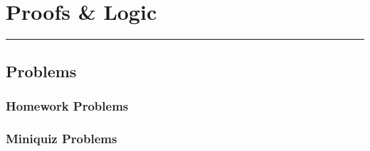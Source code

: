 \usenotesproblems
\renewcommand{\linput}[1]{}

\chapter{Proofs \& Logic}\label{C01}


\instatements{\linput{Section0100}}

\instatements{\linput{Section0101}}
\startclassproblems

\instatements{\linput{Section0102}}
\startclassproblems

\instatements{\linput{Section0103}}
\startclassproblems

\instatements{\linput{Section0104}}
\startclassproblems

\instatements{\linput{Section0105}}
\startclassproblems

\noindent\rule{\textwidth}{0.01in}\par
\nointerlineskip
\section{Problems}

\subsection*{Homework Problems}
\clearpage

\subsection*{Miniquiz Problems}
\clearpage

\endinput